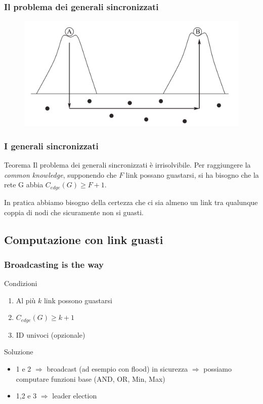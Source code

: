 		\begin{frame}
			\frametitle{Il problema dei generali sincronizzati}
			\begin{center}
				\begin{figure}
					\includegraphics[width=\textwidth]{img/generali}
				\end{figure}			
			\end{center}		
		\end{frame}
	
		\begin{frame}
			\frametitle{I generali sincronizzati}
			\begin{block}{Teorema}
				Il problema dei generali sincronizzati è irrisolvibile. Per raggiungere la \emph{common knowledge}, supponendo che $F$ link possano guastarsi, si ha bisogno che la rete G abbia $C_{edge}(G) \geq F+1$.	
			\end{block}
			In pratica abbiamo bisogno della certezza che ci sia almeno un link tra qualunque coppia di nodi che sicuramente non si guasti.
		\end{frame}
	
	\subsection{Computazione con link guasti}
	
		\begin{frame}
			\frametitle{Broadcasting is the way}
			\begin{block}{Condizioni}
				\begin{enumerate}
					\item Al più $k$ link possono guastarsi
					\item $C_{edge}(G) \geq k+1$
					\item ID univoci (opzionale)
				\end{enumerate}
			\end{block}
			\begin{block}{Soluzione}
				\begin{itemize}
					\item 1 e 2 $\Rightarrow$ broadcast (ad esempio con flood) in sicurezza $\Rightarrow$ possiamo computare funzioni base (AND, OR, Min, Max)
					\item 1,2 e 3 $\Rightarrow$ leader election
				\end{itemize}
			\end{block}		
		\end{frame}
	
